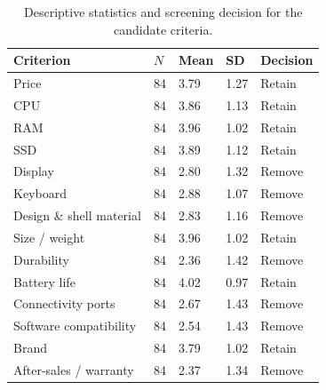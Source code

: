 \begin{table}[htbp]
\centering
\caption{Descriptive statistics and screening decision for the candidate criteria.}
\label{tab:survey-results}
\begin{tabularx}{\textwidth}{@{}YL{1.3cm}L{1.7cm}L{1.7cm}L{2.2cm}@{}}
\toprule
Criterion & $N$ & Mean & SD & Decision \\
\midrule
Price & 84 & 3.79 & 1.27 & Retain \\
CPU & 84 & 3.86 & 1.13 & Retain \\
RAM & 84 & 3.96 & 1.02 & Retain \\
SSD & 84 & 3.89 & 1.12 & Retain \\
Display & 84 & 2.80 & 1.32 & Remove \\
Keyboard & 84 & 2.88 & 1.07 & Remove \\
Design \& shell material & 84 & 2.83 & 1.16 & Remove \\
Size / weight & 84 & 3.96 & 1.02 & Retain \\
Durability & 84 & 2.36 & 1.42 & Remove \\
Battery life & 84 & 4.02 & 0.97 & Retain \\
Connectivity ports & 84 & 2.67 & 1.43 & Remove \\
Software compatibility & 84 & 2.54 & 1.43 & Remove \\
Brand & 84 & 3.79 & 1.02 & Retain \\
After-sales / warranty & 84 & 2.37 & 1.34 & Remove \\
\bottomrule
\end{tabularx}
\end{table}
